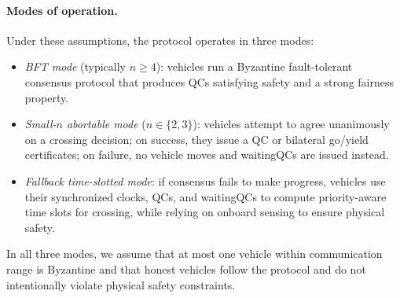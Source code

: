 \documentclass[fleqn,10pt]{olplainarticle}
\begin{document}
\paragraph{Modes of operation.}
Under these assumptions, the protocol operates in three modes:
\begin{itemize}
  \item \emph{BFT mode} (typically $n \ge 4$): vehicles run a Byzantine fault-tolerant consensus protocol that produces QCs satisfying safety and a strong fairness property.
  \item \emph{Small-$n$ abortable mode} ($n \in \{2,3\}$): vehicles attempt to agree unanimously on a crossing decision; on success, they issue a QC or bilateral go/yield certificates; on failure, no vehicle moves and waitingQCs are issued instead.
  \item \emph{Fallback time-slotted mode}: if consensus fails to make progress, vehicles use their synchronized clocks, QCs, and waitingQCs to compute priority-aware time slots for crossing, while relying on onboard sensing to ensure physical safety.
\end{itemize}
In all three modes, we assume that at most one vehicle within communication range is Byzantine and that honest vehicles follow the protocol and do not intentionally violate physical safety constraints.
\end{document}
